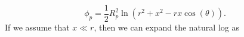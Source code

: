 \begin{equation}
\phi_p = \frac{1}{2}R_p^2 \ln(r^2 + x^2 - r x \cos(\theta)).
\end{equation}
If we assume that $x \ll r$, then we can expand the natural log as
\small